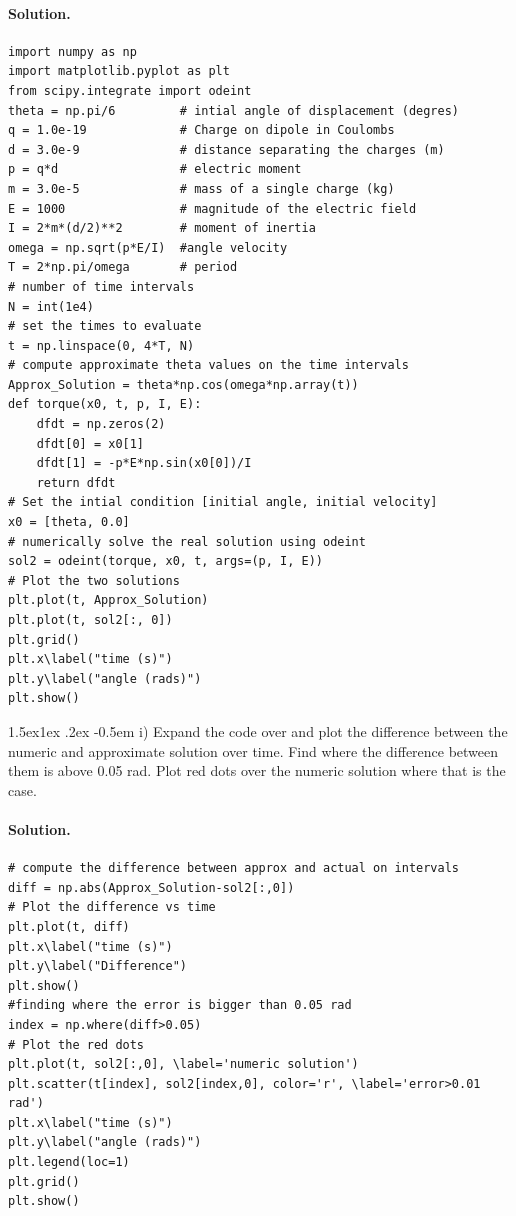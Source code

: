 \documentclass[%
oneside,                 %
final,                   %
10pt]{article}
\makeatletter
\newenvironment{doconceexercise}{}{}
\newcommand\subex{\@startsection{paragraph}{4}{\z@}%
                  {1.5ex\@plus1ex \@minus.2ex}%
                  {-0.5em}%
                  {\normalfont\normalsize\bfseries}}
\makeatother
\begin{document}
\begin{doconceexercise}
\paragraph{Solution.}
\begin{verbatim}
import numpy as np
import matplotlib.pyplot as plt
from scipy.integrate import odeint
theta = np.pi/6         # intial angle of displacement (degres)
q = 1.0e-19             # Charge on dipole in Coulombs
d = 3.0e-9              # distance separating the charges (m)
p = q*d                 # electric moment
m = 3.0e-5              # mass of a single charge (kg)
E = 1000                # magnitude of the electric field
I = 2*m*(d/2)**2        # moment of inertia
omega = np.sqrt(p*E/I)  #angle velocity
T = 2*np.pi/omega       # period
# number of time intervals
N = int(1e4)
# set the times to evaluate
t = np.linspace(0, 4*T, N)
# compute approximate theta values on the time intervals
Approx_Solution = theta*np.cos(omega*np.array(t))
def torque(x0, t, p, I, E):
    dfdt = np.zeros(2)
    dfdt[0] = x0[1]
    dfdt[1] = -p*E*np.sin(x0[0])/I
    return dfdt
# Set the intial condition [initial angle, initial velocity]
x0 = [theta, 0.0]
# numerically solve the real solution using odeint
sol2 = odeint(torque, x0, t, args=(p, I, E))
# Plot the two solutions
plt.plot(t, Approx_Solution)
plt.plot(t, sol2[:, 0])
plt.grid()
plt.x\label("time (s)")
plt.y\label("angle (rads)")
plt.show()
\end{verbatim}


\subex{i)}
Expand the code over and plot the difference between the numeric and approximate solution over time. Find where the difference between them is above 0.05 rad. Plot red dots over the numeric solution where that is the case.


\paragraph{Solution.}
\begin{verbatim}
# compute the difference between approx and actual on intervals
diff = np.abs(Approx_Solution-sol2[:,0])
# Plot the difference vs time
plt.plot(t, diff)
plt.x\label("time (s)")
plt.y\label("Difference")
plt.show()
#finding where the error is bigger than 0.05 rad
index = np.where(diff>0.05)
# Plot the red dots
plt.plot(t, sol2[:,0], \label='numeric solution')
plt.scatter(t[index], sol2[index,0], color='r', \label='error>0.01 rad')
plt.x\label("time (s)")
plt.y\label("angle (rads)")
plt.legend(loc=1)
plt.grid()
plt.show()
\end{verbatim}


\end{doconceexercise}



\end{document}
